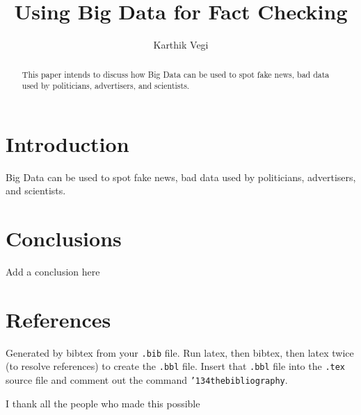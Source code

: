 \documentclass[sigconf]{acmart}
\begin{document}
\title{Using Big Data for Fact Checking}

\author{Karthik Vegi}


\renewcommand{\shortauthors}{kvegi}

\begin{abstract}
This paper intends to discuss how Big Data can be used to spot fake news, bad data used by politicians, advertisers, and scientists.
\end{abstract}


\maketitle

\section{Introduction}

Big Data can be used to spot fake news, bad data used by politicians, advertisers, and scientists.

\section{Conclusions}
Add a conclusion here
\section{References}

Generated by bibtex from your \texttt{.bib} file.  Run latex, then
bibtex, then latex twice (to resolve references) to create the
\texttt{.bbl} file.  Insert that \texttt{.bbl} file into the
\texttt{.tex} source file and comment out the command
\texttt{{\char'134}thebibliography}.


\begin{acks}

I thank all the people who made this possible

\end{acks}


 
\end{document}
